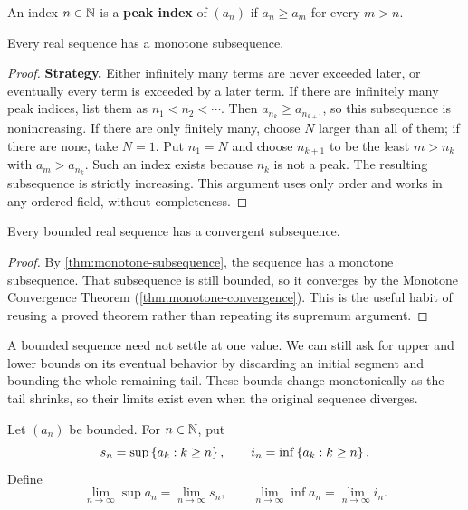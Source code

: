 \begin{definition}
An index $n\in\mathbb{N}$ is a \textbf{peak index} of $(a_n)$ if
$a_n\geq a_m$ for every $m>n$.
\end{definition}
\begin{theorem}\label{thm:monotone-subsequence}
Every real sequence has a monotone subsequence.
\end{theorem}
\begin{proof}
\textbf{Strategy.} Either infinitely many terms are never exceeded later,
or eventually every term is exceeded by a later term.
If there are infinitely many peak indices, list them as
$n_1<n_2<\cdots$. Then $a_{n_k}\geq a_{n_{k+1}}$, so this subsequence
is nonincreasing. If there are only finitely many, choose $N$ larger
than all of them; if there are none, take $N=1$. Put $n_1=N$ and choose
$n_{k+1}$ to be the least $m>n_k$ with $a_m>a_{n_k}$. Such an index exists
because $n_k$ is not a peak. The resulting subsequence is strictly increasing.
This argument uses only order and works in any ordered field, without completeness.
\end{proof}

\begin{theorem}
\label{thm:bolzano-weierstrass}
Every bounded real sequence has a convergent subsequence.
\end{theorem}
\begin{proof}
By \cref{thm:monotone-subsequence}, the sequence has a monotone
subsequence. That subsequence is still bounded, so it converges by the
Monotone Convergence Theorem (\cref{thm:monotone-convergence}).
This is the useful habit of reusing a proved theorem rather than repeating
its supremum argument.
\end{proof}

A bounded sequence need not settle at one value. We can still ask for
upper and lower bounds on its eventual behavior by discarding an initial
segment and bounding the whole remaining tail. These bounds change
monotonically as the tail shrinks, so their limits exist even when the
original sequence diverges.

\begin{definition}
Let $(a_n)$ be bounded. For $n\in\mathbb{N}$, put
\[
s_n=\sup\left\{a_k:k\geq n\right\},\qquad i_n=\inf\left\{a_k:k\geq n\right\}.
\]
Define
\[
\lim_{n\to\infty}\sup a_n=\lim_{n\to\infty}s_n,
\qquad
\lim_{n\to\infty}\inf a_n=\lim_{n\to\infty}i_n.
\]
\end{definition}

